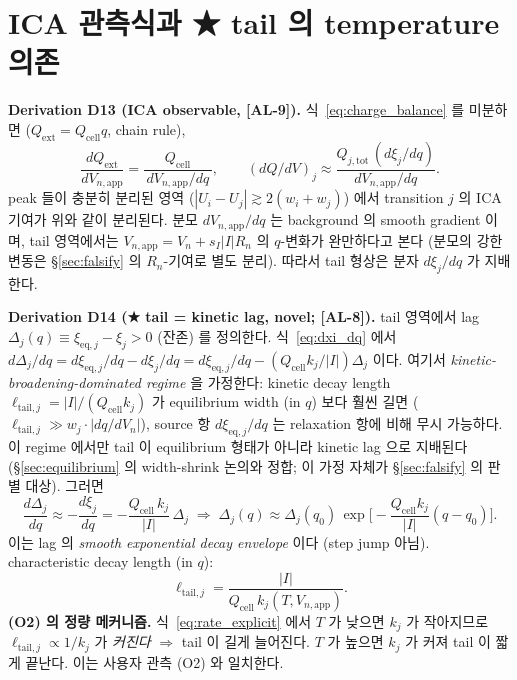 \documentclass[11pt,a4paper]{article}
\newcommand{\eq}{\mathrm{eq}}
\newcommand{\app}{\mathrm{app}}
\newcommand{\tot}{\mathrm{tot}}
\newcommand{\cell}{\mathrm{cell}}
\newcommand{\ext}{\mathrm{ext}}
\newcommand{\AL}[1]{\textsf{[AL-#1]}}
\begin{document}
\section{ICA 관측식과 ★ tail 의 temperature 의존}\label{sec:tail}
\textbf{Derivation D13 (ICA observable, \AL{9}).} 식~\eqref{eq:charge_balance} 를
미분하면 ($Q_\ext=Q_\cell q$, chain rule),
\begin{equation}
\frac{dQ_\ext}{dV_{n,\app}} = \frac{Q_\cell}{\,dV_{n,\app}/dq\,},\qquad
(dQ/dV)_j \approx \frac{Q_{j,\tot}\,(d\xi_j/dq)}{dV_{n,\app}/dq}.
\label{eq:ica}
\end{equation}
peak 들이 충분히 분리된 영역 ($|U_i-U_j|\gtrsim2(w_i+w_j)$) 에서 transition $j$ 의 ICA
기여가 위와 같이 분리된다. 분모 $dV_{n,\app}/dq$ 는 background 의 smooth gradient
이며, tail 영역에서는 $V_{n,\app}=V_n+s_I|I|R_n$ 의 $q$-변화가 완만하다고 본다
(분모의 강한 변동은 \S\ref{sec:falsify} 의 $R_n$-기여로 별도 분리). 따라서 tail 형상은
분자 $d\xi_j/dq$ 가 지배한다.

\textbf{Derivation D14 (★ tail = kinetic lag, novel; \AL{8}).} tail 영역에서
lag $\Delta_j(q)\equiv\xi_{\eq,j}-\xi_j>0$ (잔존) 를 정의한다. 식~\eqref{eq:dxi_dq} 에서
$d\Delta_j/dq = d\xi_{\eq,j}/dq - d\xi_j/dq = d\xi_{\eq,j}/dq - (Q_\cell k_j/|I|)\Delta_j$
이다. 여기서 \emph{kinetic-broadening-dominated regime} 을 가정한다: kinetic decay
length $\ell_{\mathrm{tail},j}=|I|/(Q_\cell k_j)$ 가 equilibrium width (in $q$) 보다
훨씬 길면 ($\ell_{\mathrm{tail},j}\gg w_j\cdot|dq/dV_{n}|$), source 항 $d\xi_{\eq,j}/dq$
는 relaxation 항에 비해 무시 가능하다. 이 regime 에서만 tail 이 equilibrium 형태가
아니라 kinetic lag 으로 지배된다 (\S\ref{sec:equilibrium} 의 width-shrink 논의와 정합;
이 가정 자체가 \S\ref{sec:falsify} 의 판별 대상). 그러면
\begin{equation}
\frac{d\Delta_j}{dq}\approx-\frac{d\xi_j}{dq}=-\frac{Q_\cell\,k_j}{|I|}\,\Delta_j
\;\Rightarrow\;
\Delta_j(q)\approx\Delta_j(q_0)\,\exp\!\Big[-\frac{Q_\cell k_j}{|I|}(q-q_0)\Big].
\label{eq:tail_env}
\end{equation}
이는 lag 의 \emph{smooth exponential decay envelope} 이다 (step jump 아님). characteristic
decay length (in $q$):
\begin{equation}
\boxed{\;\ell_{\mathrm{tail},j} = \frac{|I|}{Q_\cell\,k_j(T,V_{n,\app})}.\;}
\label{eq:tail_len}
\end{equation}
\textbf{(O2) 의 정량 메커니즘.} 식~\eqref{eq:rate_explicit} 에서 $T$ 가 낮으면 $k_j$ 가
작아지므로 $\ell_{\mathrm{tail},j}\propto1/k_j$ 가 \emph{커진다} $\Rightarrow$ tail 이
길게 늘어진다. $T$ 가 높으면 $k_j$ 가 커져 tail 이 짧게 끝난다. 이는 사용자 관측 (O2)
와 일치한다.
\end{document}
